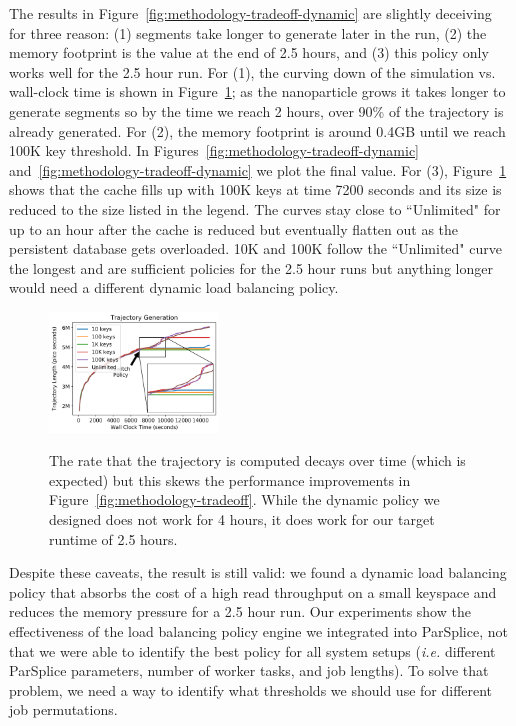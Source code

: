 The results in Figure~\ref{fig:methodology-tradeoff-dynamic} are slightly
deceiving for three reason: (1) segments take longer to generate later in the
run, (2) the memory footprint is the value at the end of 2.5 hours, and (3)
this policy only works well for the 2.5 hour run.  For (1), the curving down of
the simulation vs. wall-clock time is shown in
Figure~\ref{fig:methodology-trajectory}; as the nanoparticle grows it takes
longer to generate segments so by the time we reach 2 hours, over 90\% of the
trajectory is already generated.  For (2), the memory footprint is around 0.4GB
until we reach 100K key threshold. In
Figures~\ref{fig:methodology-tradeoff-dynamic}
and~\ref{fig:methodology-tradeoff-dynamic} we plot the final value. For (3),
Figure~\ref{fig:methodology-trajectory} shows that the cache fills up with 100K
keys at time 7200 seconds and its size is reduced to the size listed in the
legend.  The curves stay close to ``Unlimited" for up to an hour after the
cache is reduced but eventually flatten out as the persistent database gets
overloaded. 10K and 100K follow the ``Unlimited" curve the longest and are
sufficient policies for the 2.5 hour runs but anything longer would need a
different dynamic load balancing policy.

\begin{figure}[t]
  \noindent\includegraphics[width=0.4\textwidth]{figures/methodology-trajectory.png}\\
  \caption{The rate that the trajectory is computed decays over time (which is
  expected) but this skews the performance improvements in
  Figure~\ref{fig:methodology-tradeoff}. While the dynamic policy we designed
  does not work for 4 hours, it does work for our target
  runtime of 2.5 hours. \label{fig:methodology-trajectory}}
\end{figure}

Despite these caveats, the result is still valid: we found a dynamic load
balancing policy that absorbs the cost of a high read throughput on a small
keyspace and reduces the memory pressure for a 2.5 hour run. Our experiments
show the effectiveness of the load balancing policy engine we integrated into
ParSplice, not that we were able to identify the best policy for all system
setups ({\it i.e.} different ParSplice parameters, number of worker tasks, and
job lengths).  To solve that problem, we need a way to identify what thresholds
we should use for different job permutations.


